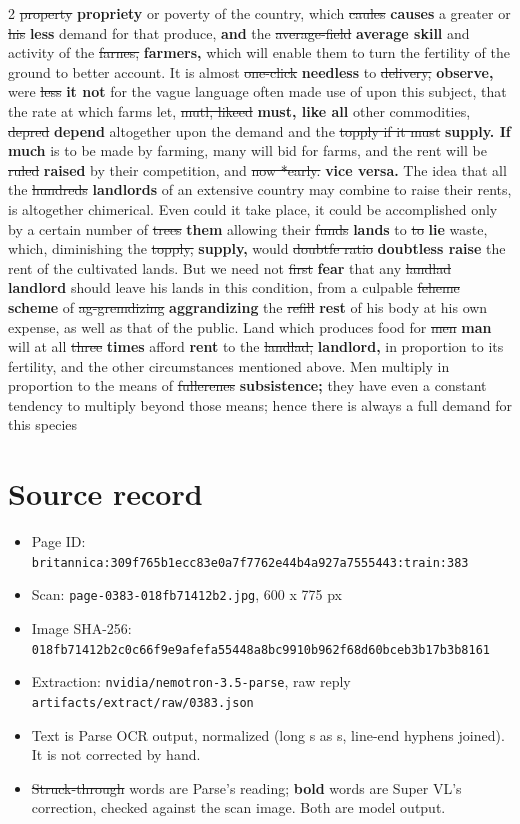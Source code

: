 \documentclass[10pt]{article}
\begin{document}
\begin{multicols}{2}
\sout{property} \textbf{propriety} or poverty of the country, which \sout{caules} \textbf{causes} a greater or \sout{his} \textbf{less} demand for that produce, \textbf{and} the \sout{average-field} \textbf{average skill} and activity of the \sout{farnes,} \textbf{farmers,} which will enable them to turn the fertility of the ground to better account. It is almost \sout{one-click} \textbf{needless} to \sout{delivery,} \textbf{observe,} were \sout{less} \textbf{it not} for the vague language often made use of upon this subject, that the rate at which farms let, \sout{mutl, likeed} \textbf{must, like all} other commodities, \sout{depred} \textbf{depend} altogether upon the demand and the \sout{topply if it must} \textbf{supply. If much} is to be made by farming, many will bid for farms, and the rent will be \sout{ruled} \textbf{raised} by their competition, and \sout{now *early.} \textbf{vice versa.} The idea that all the \sout{hundreds} \textbf{landlords} of an extensive country may combine to raise their rents, is altogether chimerical. Even could it take place, it could be accomplished only by a certain number of \sout{trees} \textbf{them} allowing their \sout{funds} \textbf{lands} to \sout{to} \textbf{lie} waste, which, diminishing the \sout{topply,} \textbf{supply,} would \sout{doubtfe ratio} \textbf{doubtless raise} the rent of the cultivated lands. But we need not \sout{first} \textbf{fear} that any \sout{landlad} \textbf{landlord} should leave his lands in this condition, from a culpable \sout{feheme} \textbf{scheme} of \sout{ag-gremdizing} \textbf{aggrandizing} the \sout{refill} \textbf{rest} of his body at his own expense, as well as that of the public. Land which produces food for \sout{men} \textbf{man} will at all \sout{three} \textbf{times} afford \textbf{rent} to the \sout{landlad,} \textbf{landlord,} in proportion to its fertility, and the other circumstances mentioned above. Men multiply in proportion to the means of \sout{fullerenes} \textbf{subsistence;} they have even a constant tendency to multiply beyond those means; hence there is always a full demand for this species
\end{multicols}
\section*{Source record}
\begin{itemize}
\item Page ID: \texttt{britannica:309f765b1ecc83e0a7f7762e44b4a927a7555443:train:383}
\item Scan: \texttt{page-0383-018fb71412b2.jpg}, 600 x 775 px
\item Image SHA-256: \texttt{\small 018fb71412b2c0c66f9e9afefa55448a8bc9910b962f68d60bceb3b17b3b8161}
\item Extraction: \texttt{nvidia/nemotron-3.5-parse}, raw reply \texttt{artifacts/extract/raw/0383.json}
\item Text is Parse OCR output, normalized (long s as s, line-end hyphens joined). It is not corrected by hand.
\item \sout{Struck-through} words are Parse's reading; \textbf{bold} words are Super VL's correction, checked against the scan image. Both are model output.
\end{itemize}
\end{document}
